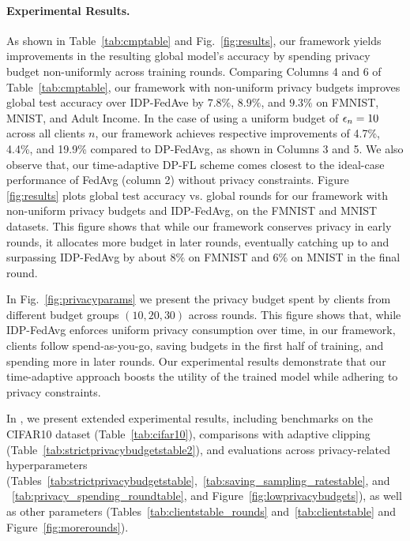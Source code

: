 \paragraph{Experimental Results.} As shown in Table~\ref{tab:cmptable} and Fig.~\ref{fig:results}, our framework yields improvements in the resulting global model's accuracy by spending privacy budget non-uniformly across training rounds. Comparing Columns 4 and 6 of Table~\ref{tab:cmptable}, our framework with non-uniform privacy budgets improves global test accuracy over IDP-FedAve by $7.8\%$, $8.9\%$, and $9.3\%$ on FMNIST, MNIST, and Adult Income. In the case of using a uniform budget of ${\epsilon}_n=10$ across all clients $n$, our framework achieves respective improvements of 4.7\%, 4.4\%, and 19.9\% compared to DP-FedAvg, as shown in Columns 3 and 5. {We also observe that, our time-adaptive DP-FL scheme comes closest to the ideal-case performance of FedAvg (column 2) without privacy constraints.} Figure \ref{fig:results} plots global test accuracy vs. global rounds for our framework with non-uniform privacy budgets and IDP-FedAvg, on the FMNIST and MNIST datasets. This figure shows that while our framework conserves privacy in early rounds, it allocates more budget in later rounds, eventually catching up to and surpassing IDP-FedAvg by about $8\%$ on FMNIST and $6\%$ on MNIST in the final round. 

In Fig.~\ref{fig:privacyparams} we present the privacy budget spent by clients from different budget groups $(10,20,30)$ across rounds. This figure shows that,  while IDP-FedAvg enforces uniform privacy consumption over time, in our framework, clients follow spend-as-you-go, saving budgets in the first half of training, and spending more in later rounds. Our experimental results demonstrate that our time-adaptive approach boosts the utility of the trained model while adhering to privacy constraints. 

{In , we present extended experimental results, including benchmarks on the CIFAR10 dataset (Table~\ref{tab:cifar10}), comparisons with adaptive clipping (Table~\ref{tab:strictprivacybudgetstable2}), and evaluations across privacy-related hyperparameters (Tables~\ref{tab:strictprivacybudgetstable},~\ref{tab:saving_sampling_ratestable}, and ~\ref{tab:privacy_spending_roundtable}, and Figure~\ref{fig:lowprivacybudgets}), as well as other parameters (Tables~\ref{tab:clientstable_rounds} and~\ref{tab:clientstable} and Figure~\ref{fig:morerounds}).} 


